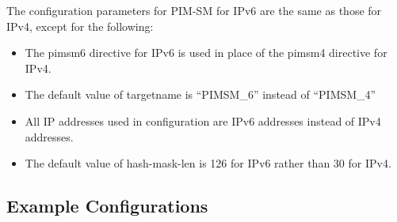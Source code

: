 The configuration parameters for PIM-SM for IPv6 are the same as those
for IPv4, except for the following:
\begin{itemize}
\item The {\stt pimsm6} directive for IPv6 is used in place of the
  {\stt pimsm4} directive for IPv4.
\item The default value of {\stt targetname} is ``{\stt PIMSM\_6}''
  instead of ``{\stt PIMSM\_4}''
\item All IP addresses used in configuration are IPv6 addresses
  instead of IPv4 addresses.
\item The default value of {\stt hash-mask-len} is 126 for IPv6 rather
  than 30 for IPv4.
\end{itemize}

\newpage
\subsection{Example Configurations}

